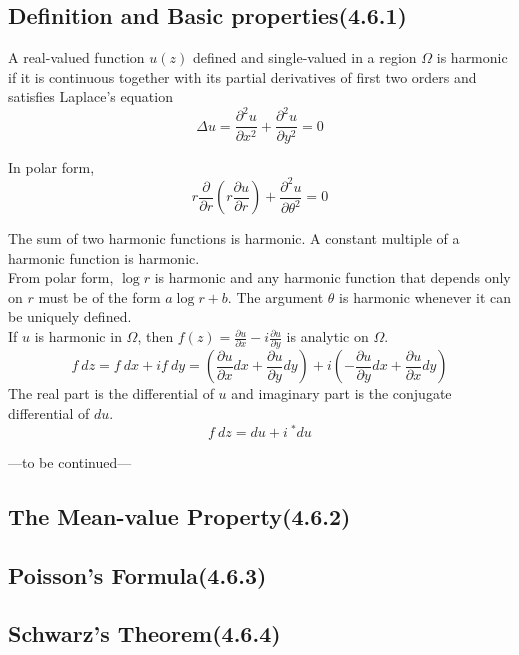 \subsection{Definition and Basic properties(4.6.1)}
\begin{definition}[harmonic]
	A real-valued function $u(z)$ defined and single-valued in a region $\Omega$ is harmonic if it is continuous together with its partial derivatives of first two orders and satisfies Laplace's equation
	\[ \Delta u = \frac{\partial^2 u}{\partial x^2} + \frac{\partial^2 u}{\partial y^2} = 0 \]

	In polar form,
	\[ r \frac{\partial}{\partial r} \left( r \frac{\partial u}{\partial r}\right) + \frac{\partial^2 u}{\partial \theta^2} = 0 \]
\end{definition}
\begin{remark}
	The sum of two harmonic functions is harmonic. A constant multiple of a harmonic function is harmonic.\\

	From polar form, $\log r$ is harmonic and any harmonic function that depends only on $r$ must be of the form $a \log r + b$.  The argument $\theta$ is harmonic whenever it can be uniquely defined. \\

	If $u$ is harmonic in $\Omega$, then $f(z) = \frac{\partial u}{\partial x} - i \frac{\partial u}{\partial y}$ is analytic on $\Omega$.\\

	\[ f\ dz = f\ dx+i f\ dy = \left( \frac{\partial u}{\partial x} dx + \frac{\partial u}{\partial y}dy \right) + i \left( -\frac{\partial u}{\partial y}dx + \frac{\partial u}{\partial x}dy \right) \]
	The real part is the differential of $u$ and imaginary part is the conjugate differential of $du$.
	\[ f\ dz = du + i\ \underset{}{^\ast}du \]
\end{remark}

---to be continued---

\subsection{The Mean-value Property(4.6.2)}
\subsection{Poisson's Formula(4.6.3)}
\subsection{Schwarz's Theorem(4.6.4)}
